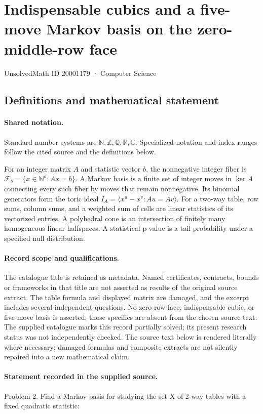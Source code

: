 \documentclass[11pt]{article}
\begin{document}
\setcounter{section}{20001178}
\section{Indispensable cubics and a five-move Markov basis on the zero-middle-row face}\label{20001179}
{\small\sffamily UnsolvedMath ID 20001179 · Computer Science}
\subsection{Definitions and mathematical statement}

\paragraph{Shared notation.}Standard number systems are $\mathbb N,\mathbb Z,\mathbb Q,\mathbb R,\mathbb C$. Specialized notation and index ranges follow the cited source and the definitions below.


For an integer matrix $A$ and statistic vector $b$, the nonnegative integer fiber is $\mathcal F_b=\{x\in\mathbb N^d:Ax=b\}$. A Markov basis is a finite set of integer moves in $\ker A$ connecting every such fiber by moves that remain nonnegative. Its binomial generators form the toric ideal $I_A=\langle x^u-x^v:Au=Av\rangle$. For a two-way table, row sums, column sums, and a weighted sum of cells are linear statistics of its vectorized entries. A polyhedral cone is an intersection of finitely many homogeneous linear halfspaces. A statistical p-value is a tail probability under a specified null distribution.
\paragraph{Record scope and qualifications.}
The catalogue title is retained as metadata. Named certificates, contracts, bounds or frameworks in that title are not asserted as results of the original source extract.
The table formula and displayed matrix are damaged, and the excerpt includes several independent questions. No zero-row face, indispensable cubic, or five-move basis is asserted; those specifics are absent from the chosen source text. The supplied catalogue marks this record partially solved; its present research status was not independently checked.
The source text below is rendered literally where necessary; damaged formulas and composite extracts are not silently repaired into a new mathematical claim.
\paragraph{Statement recorded in the supplied source.}
Problem 2. Find a Markov basis for studying the set X of 2-way tables with a fixed quadratic statistic:
\end{document}

